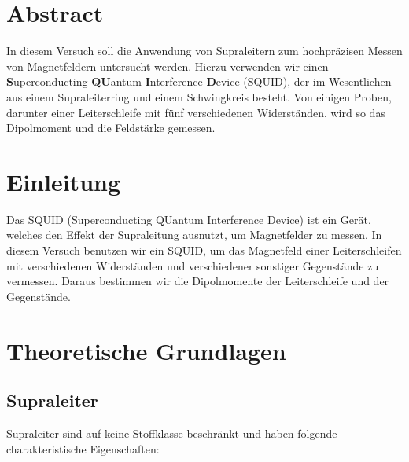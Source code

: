 \documentclass[12pt]{article}
\title{\vspace{0cm}{\Huge Fortgeschrittenen-Praktikum I:\\ \vspace{1cm} SQUID}}
\author{Saskia Bondza\\Simon Stephan}
\date{durchgeführt am 23.09.2016}
\begin{document}
\maketitle
\newpage

\section*{Abstract}

In diesem Versuch soll die Anwendung von Supraleitern zum hochpräzisen  Messen von Magnetfeldern untersucht werden. Hierzu verwenden wir einen \textbf{S}uperconducting \textbf{QU}antum \textbf{I}nterference \textbf{D}evice (SQUID), der im Wesentlichen aus einem Supraleiterring und einem Schwingkreis besteht. Von einigen Proben, darunter einer Leiterschleife mit fünf verschiedenen Widerständen, wird so das Dipolmoment und die Feldstärke gemessen.

\newpage

\thispagestyle{empty}
\tableofcontents
\newpage

\section{Einleitung}

Das SQUID (Superconducting QUantum Interference Device) ist ein Gerät, welches den Effekt der Supraleitung ausnutzt, um Magnetfelder zu messen. In diesem Versuch benutzen wir ein SQUID, um das Magnetfeld einer Leiterschleifen mit verschiedenen Widerständen und verschiedener sonstiger Gegenstände zu vermessen. Daraus bestimmen wir die Dipolmomente der Leiterschleife und der Gegenstände.


\newpage
\section{Theoretische Grundlagen}


\subsection{Supraleiter}\label{supraleiter}
Supraleiter sind auf keine Stoffklasse beschränkt und haben folgende charakteristische Eigenschaften:
\end{document}
